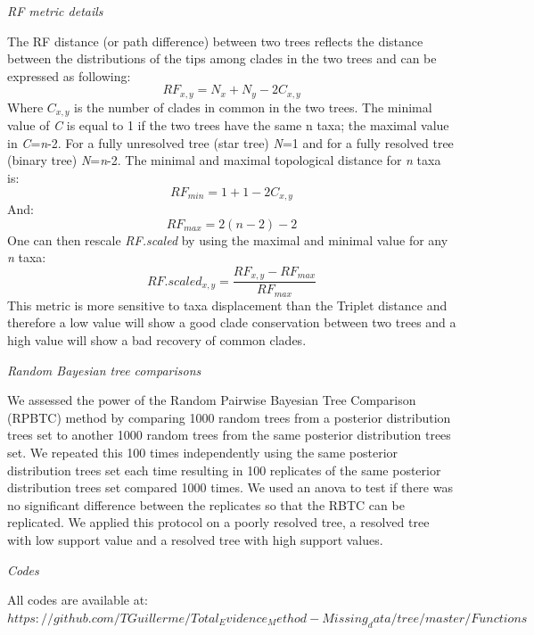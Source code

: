 \documentclass[12pt,letterpaper]{article}
\renewcommand{\subsection}[1]{%
\bigskip
\begin{center}
\begin{large}
\normalfont\itshape #1
\end{large}
\end{center}}
\begin{document}
\subsection{RF metric details}
The RF distance (or path difference) between two trees reflects the distance between the distributions of the tips among clades in the two trees \citep{RF1981} and can be expressed as following:
\begin{equation}
RF_{x,y} = N_{x} + N_{y} - 2C_{x,y}
\end{equation}
Where $C_{x,y}$ is the number of clades in common in the two trees. 
The minimal value of \textit{C} is equal to 1 if the two trees have the same n taxa;
the maximal value in \textit{C}=\textit{n}-2.
For a fully unresolved tree (star tree) \textit{N}=1 and for a fully resolved tree (binary tree) \textit{N}=\textit{n}-2.
The minimal and maximal topological distance for \textit{n} taxa is:
\begin{equation}
RF_{min} = 1 + 1 - 2C_{x,y}
\end{equation}
And:
\begin{equation}
RF_{max} = 2(n-2)-2
\end{equation}
One can then rescale \textit{RF.scaled} by using the maximal and minimal value for any \textit{n} taxa:
\begin{equation}
RF.scaled_{x,y} = \frac{RF_{x,y}-RF_{max}}{RF_{max}}
\end{equation}
This metric is more sensitive to taxa displacement than the Triplet distance \citep{critchlowthe1996,johnson1998,wiensmissing2003} and therefore a low value will show a good clade conservation between two trees and a high value will show a bad recovery of common clades.

\subsection{Random Bayesian tree comparisons}
We assessed the power of the Random Pairwise Bayesian Tree Comparison (RPBTC) method by comparing 1000 random trees from a posterior distribution trees set to another 1000 random trees from the same posterior distribution trees set.
We repeated this 100 times independently using the same posterior distribution trees set each time resulting in 100 replicates of the same posterior distribution trees set compared 1000 times.
We used an anova to test if there was no significant difference between the replicates so that the RBTC can be replicated.
We applied this protocol on a poorly resolved tree, a resolved tree with low support value and a resolved tree with high support values.

\subsection{Codes}
All codes are available at: $https://github.com/TGuillerme/Total_Evidence_Method-Missing_data/tree/master/Functions$

\end{document}
